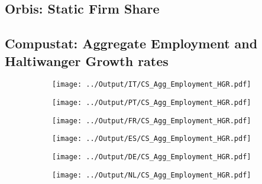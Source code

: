 \documentclass[12pt,notitlepage]{article}
\begin{document}
\clearpage

\subsection{Orbis: Static Firm Share}

\begin{table}[htpb]
\end{table}




\clearpage


\subsection{Compustat: Aggregate Employment and Haltiwanger Growth rates}
\begin{figure}[!htpb]
\centering
\begin{subfigure}{.49\textwidth}
    \centering
 \texttt{[image: ../Output/IT/CS\_Agg\_Employment\_HGR.pdf]}
\end{subfigure}%
\begin{subfigure}{.49\textwidth}
    \centering
 \texttt{[image: ../Output/PT/CS\_Agg\_Employment\_HGR.pdf]}
\end{subfigure}
\begin{subfigure}{.49\textwidth}
    \centering
 \texttt{[image: ../Output/FR/CS\_Agg\_Employment\_HGR.pdf]}
\end{subfigure}%
\begin{subfigure}{.49\textwidth}
    \centering
 \texttt{[image: ../Output/ES/CS\_Agg\_Employment\_HGR.pdf]}
\end{subfigure}
\begin{subfigure}{.49\textwidth}
    \centering
 \texttt{[image: ../Output/DE/CS\_Agg\_Employment\_HGR.pdf]}
\end{subfigure}
\begin{subfigure}{.49\textwidth}
    \centering
 \texttt{[image: ../Output/NL/CS\_Agg\_Employment\_HGR.pdf]}
\end{subfigure}
\end{figure}
\end{document}
